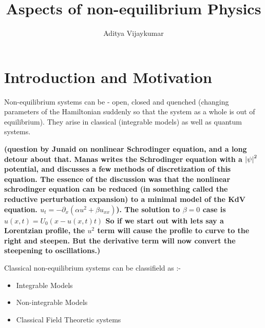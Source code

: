 \documentclass[a4paper,11pt]{article}
\title{\textbf{Aspects of non-equilibrium Physics}}
\author{Aditya Vijaykumar}
\affiliation{International Centre for Theoretical Sciences, Bengaluru, India.}
\begin{document}
\maketitle

\section{Introduction and Motivation}
Non-equilibrium systems can be - open, closed and quenched (changing parameters of the Hamiltonian suddenly so that the system as a whole is out of equilibrium). They arise in classical (integrable models) as well as quantum systems.

\textbf{(question by Junaid on nonlinear Schrodinger equation, and a long detour about that. Manas writes the Schrodinger equation with a $ \abs{\psi}^2 $ potential, and discusses a few methods of discretization of this equation. The essence of the discussion was that the nonlinear schrodinger equation can be reduced (in something called the reductive perturbation expansion) to a minimal model of the KdV equation. $ u_t = -\partial_x (\alpha u^2 + \beta u_{xx}) $). The solution to $ \beta=0 $ case is $ u(x,t) = U_0(x - u(x,t) t) $ So if we start out with lets say a Lorentzian profile, the $ u^2  $ term will cause the profile to curve to the right and steepen. But the derivative term will now convert the steepening to oscillations.) } 

Classical non-equilibrium systems can be classifield as :-
\begin{itemize}
	\item Integrable Models
	\item Non-integrable Models
	\item Classical Field Theoretic systems
\end{itemize}
\end{document}
